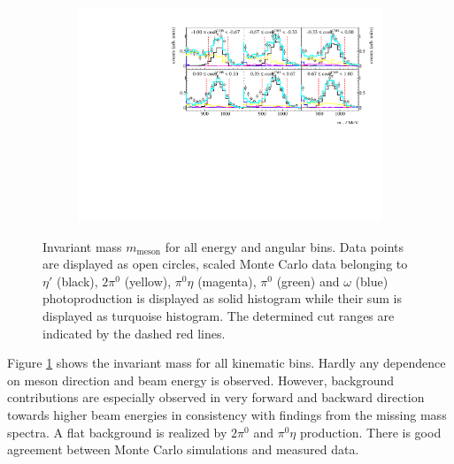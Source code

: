 \begin{figure}[H]
	\ContinuedFloat
	\begin{subfigure}{\linewidth}
		\includegraphics[width=\linewidth]{../figs/hydrogen/bin_cuts/invcut_ebin3.pdf}
	\end{subfigure}
\caption{Invariant mass $m_\text{meson}$ for all energy and angular bins. Data points are displayed as open circles, scaled Monte Carlo data belonging to $\eta'$ (black), $2\pi^0$ (yellow), $\pi^0\eta$ (magenta), $\pi^0$ (green) and $\omega$ (blue) photoproduction is displayed as solid histogram while their sum is displayed as turquoise histogram. The determined cut ranges are indicated by the dashed red lines.}
\label{fig:appinv}
\end{figure}
Figure \ref{fig:appinv} shows the invariant mass for all kinematic bins. Hardly any dependence on meson direction and beam energy is observed. However, background contributions are especially observed in very forward and backward direction towards higher beam energies in consistency with findings from the missing mass spectra.  A flat background is realized by $2\pi^0$ and $\pi^0\eta$ production. There is good agreement between Monte Carlo simulations and measured data.
